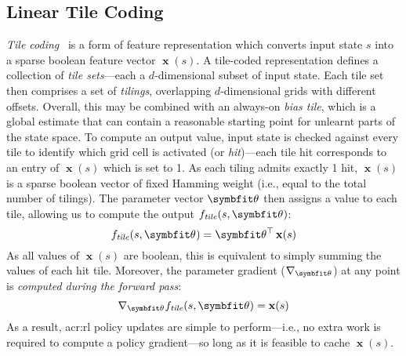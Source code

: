\subsection{Linear Tile Coding}\label{sec:tile-code}
\emph{Tile coding}~\parencite[pp.~\numrange{217}{221}]{RL2E} is a form of feature representation which converts input state $s$ into a sparse boolean feature vector $\operatorname{\mathbf{x}}(s)$.
A tile-coded representation defines a collection of \emph{tile sets}---each a $d$-dimensional subset of input state.
Each tile set then comprises a set of \emph{tilings}, overlapping $d$-dimensional grids with different offsets.
Overall, this may be combined with an always-on \emph{bias tile}, which is a global estimate that can contain a reasonable starting point for unlearnt parts of the state space.
To compute an output value, input state is checked against every tile to identify which grid cell is activated (or \emph{hit})---each tile hit corresponds to an entry of $\operatorname{\mathbf{x}}(s)$ which is set to 1.
As each tiling admits exactly 1 hit, $\operatorname{\mathbf{x}}(s)$ is a sparse boolean vector of fixed Hamming weight (i.e., equal to the total number of tilings).
The parameter vector $\wvec{}$ then assigns a value to each tile, allowing us to compute the output $f_\mathit{tile}(s, \wvec{})$:
\begin{equation}
	f_\mathit{tile}(s, \wvec{}) = \wvec{}^{\top} \operatorname{\mathbf{x}}(s)
	\label{eqn:lin-approx}
\end{equation}
As all values of $\operatorname{\mathbf{x}}(s)$ are boolean, this is equivalent to simply summing the values of each hit tile.
Moreover, the parameter gradient ($\nabla_{\wvec{}}$) at any point is \emph{computed during the forward pass}:
\begin{equation}
	\nabla_{\wvec{}}{f_\mathit{tile}(s, \wvec{})} = \operatorname{\mathbf{x}}(s)
\end{equation}
As a result, \gls{acr:rl} policy updates are simple to perform---i.e., no extra work is required to compute a policy gradient---so long as it is feasible to cache $\operatorname{\mathbf{x}}(s)$.

